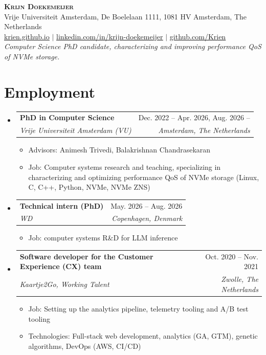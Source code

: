 \documentclass[letterpaper,11pt]{article}
\makeatletter
\newcommand{\resumeItem}[1]{
  \item\small{
    {#1 \vspace{-2pt}}
  }
}
\newcommand{\resumeSubheading}[4]{
  \vspace{-2pt}\item
    \begin{tabular*}{0.97\textwidth}[t]{l@{\extracolsep{\fill}}r}
      \textbf{#1} & #2 \\
      \textit{\small#3} & \textit{\small #4} \\
    \end{tabular*}\vspace{-7pt}
}
\newcommand{\resumeSubHeadingListStart}{\begin{itemize}[leftmargin=0.15in, label={}]}
\newcommand{\resumeSubHeadingListEnd}{\end{itemize}}
\newcommand{\resumeItemListStart}{\begin{itemize}[label={}]}
\newcommand{\resumeItemListEnd}{\end{itemize}\vspace{-5pt}}
\makeatother
\begin{document}
\begin{center}
    \textbf{\Huge \scshape Krijn Doekemeijer} \\ \vspace{1pt}
    \small Vrije Universiteit Amsterdam, De Boelelaan 1111, 1081 HV Amsterdam, The Netherlands \\ \vspace{1pt}
    \href{https://krien.github.io/}{\underline{krien.github.io}} $|$
    \href{https://linkedin.com/in/krijn-doekemeijer-9692801aa}{\underline{linkedin.com/in/krijn-doekemeijer}} $|$
    \href{https://github.com/Krien}{\underline{github.com/Krien}} \\
    \textit{ Computer Science PhD candidate, characterizing and improving performance QoS of NVMe storage. } 
\end{center}

\section{Employment}
  \resumeSubHeadingListStart
    \resumeSubheading
      {PhD in Computer Science}{Dec. 2022 -- Apr. 2026, Aug. 2026 --}
      {Vrije Universiteit Amsterdam (VU)}{Amsterdam, The Netherlands}
      \resumeItemListStart
      \resumeItem{ 
        Advisors: Animesh Trivedi, Balakrishnan Chandrasekaran
      }
      \resumeItem{
        Job: Computer systems research and teaching, specializing in characterizing and optimizing performance QoS of NVMe storage (Linux, C, C++, Python, NVMe, NVMe ZNS)
      }
      \resumeItemListEnd

     \resumeSubheading
      {Technical intern (PhD)}{May. 2026 -- Aug. 2026}
      {WD}{Copenhagen, Denmark}
      \resumeItemListStart
      \resumeItem{
        Job: computer systems R\&D for LLM inference 
      }
      \resumeItemListEnd

     
    \resumeSubheading
      {Software developer for the Customer Experience (CX) team}{Oct. 2020 -- Nov. 2021}
      {Kaartje2Go, Working Talent}{Zwolle, The Netherlands}
      \resumeItemListStart
        \resumeItem{ 
          Job: Setting up the analytics pipeline, telemetry tooling and A/B test tooling
        }
        \resumeItem{
          Technologies: Full-stack web development, analytics (GA, GTM), genetic algorithms, DevOps (AWS, CI/CD)
        }
      \resumeItemListEnd

  \resumeSubHeadingListEnd
\end{document}
